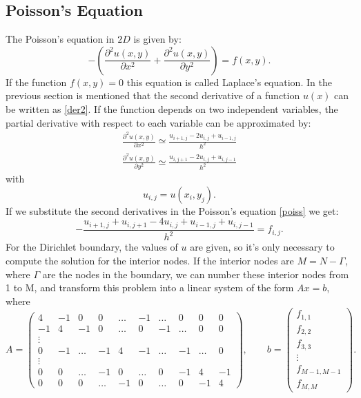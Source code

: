 \documentclass[12pt]{report}
\begin{document}
\subsection{Poisson's Equation}
The Poisson's equation in $2D$ is given by:
\begin{equation}
 -\left(\frac{\partial^2 u(x,y)}{\partial x^2}+\frac{\partial^2 u(x,y)}{\partial y^2}\right)=f(x,y). \label{poiss}
\end{equation}
If the function $f(x,y)=0$ this equation is called Laplace's equation.
In the previous section is mentioned that the second derivative of a function $u(x)$ can be written as \eqref{der2}. If the function
depends on two independent variables, the partial derivative with respect to each variable can be approximated by:
\begin{gather*}
\frac{\partial^2 u(x,y)}{\partial x^2}\simeq \frac{u_{i+1,j}-2u_{i,j}+u_{i-1,j}}{h^2}\\
 \frac{\partial^2 u(x,y)}{\partial y^2}\simeq \frac{u_{i,j+1}-2u_{i,j}+u_{i,j-1}}{h^2}
\end{gather*}
with $$u_{i,j}=u(x_i,y_j).$$
If we substitute the second derivatives in the Poisson's equation \eqref{poiss} we get:
\begin{equation*}
-\frac{u_{i+1,j}+u_{i,j+1}-4u_{i,j}+u_{i-1,j}+u_{i,j-1}}{h^2}=f_{i,j}.
\end{equation*}
For the Dirichlet boundary, the values of $u$ are given, so it's only necessary to compute the solution for the interior nodes.
If the interior nodes are $M=N-\Gamma$, where $\Gamma$ are the nodes in the boundary, we can 
number these interior nodes
from 1 to M, and transform this problem into a linear system of the form $Ax=b$, where
\begin{equation*}
A=
\begin{pmatrix}
4 & -1 & 0  & 0 &\dots &-1 &\dots  & 0 &0 &0\\
-1 &4 & -1 & 0  &\dots & 0 &-1 & \dots  & 0 &0 \\
\vdots\\
0  &-1 &\dots &  -1 &4 & -1   &\dots &-1 & \dots  & 0 \\
                    \vdots \\
0 & 0  &\dots &-1 & 0  & \dots  &0 &-1 & 4 &-1\\
0 & 0 & 0 &\dots &-1& 0  &\dots &0 &-1 & 4
\end{pmatrix}, \qquad
b=
\begin{pmatrix}
f_{1,1}\\
f_{2,2}\\
f_{3,3}\\
\vdots\\
f_{M-1,M-1}\\
f_{M,M}
\end{pmatrix}.
\end{equation*}
\end{document}
